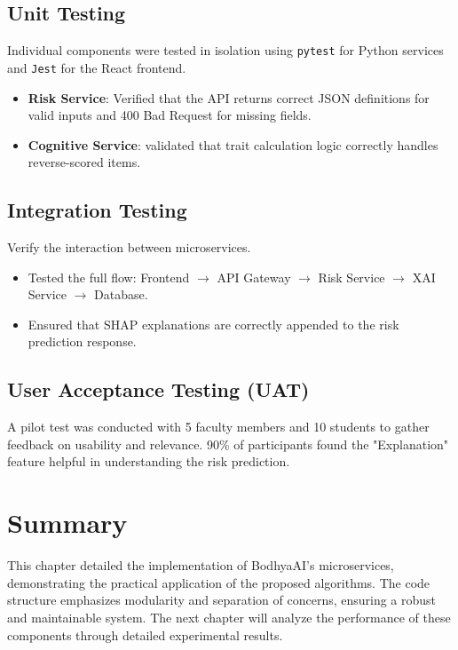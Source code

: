 \documentclass[12pt,a4paper]{report}
\begin{document}
\subsection{Unit Testing}
Individual components were tested in isolation using \texttt{pytest} for Python services and \texttt{Jest} for the React frontend.
\begin{itemize}
    \item \textbf{Risk Service}: Verified that the API returns correct JSON definitions for valid inputs and 400 Bad Request for missing fields.
    \item \textbf{Cognitive Service}: validated that trait calculation logic correctly handles reverse-scored items.
\end{itemize}

\subsection{Integration Testing}
Verify the interaction between microservices.
\begin{itemize}
    \item Tested the full flow: Frontend $\rightarrow$ API Gateway $\rightarrow$ Risk Service $\rightarrow$ XAI Service $\rightarrow$ Database.
    \item Ensured that SHAP explanations are correctly appended to the risk prediction response.
\end{itemize}

\subsection{User Acceptance Testing (UAT)}
A pilot test was conducted with 5 faculty members and 10 students to gather feedback on usability and relevance. 90\% of participants found the "Explanation" feature helpful in understanding the risk prediction.

\section{Summary}

This chapter detailed the implementation of BodhyaAI's microservices, demonstrating the practical application of the proposed algorithms. The code structure emphasizes modularity and separation of concerns, ensuring a robust and maintainable system. The next chapter will analyze the performance of these components through detailed experimental results.


\end{document}
